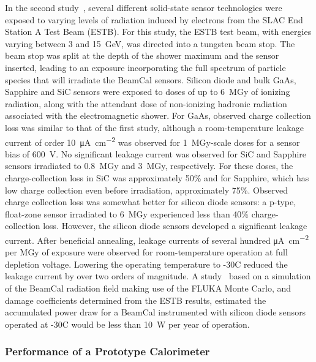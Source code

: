In the second study~\cite{Anderson:2017kkq}, several different
solid-state sensor
technologies were
exposed to varying levels of radiation induced by electrons from the
SLAC End Station A
Test Beam (ESTB).
For this study, the ESTB test beam, with energies varying between 3
and \SI{15}{GeV}, was
directed into a tungsten beam stop. The beam stop was split at the depth
of the shower maximum
and the sensor inserted,
leading to an exposure incorporating the full spectrum of particle
species that will
irradiate the BeamCal sensors. Silicon diode and bulk GaAs, Sapphire and
SiC sensors
were exposed to doses of up to \SI{6}{MGy} of ionizing radiation, along with the
attendant dose of non-ionizing hadronic radiation associated with the
electromagnetic
shower. For GaAs, observed charge collection loss was similar to that of
the first study, although a room-temperature leakage current of
order \SI{10}{\micro\ampere\per\centi\meter\squared}
was observed for \SI{1}{MGy}-scale doses for a sensor
bias of \SI{600}{V}. No significant leakage current was observed for SiC
and Sapphire sensors
irradiated to \SI{0.8}{MGy} and \SI{3}{MGy}, respectively. For these doses, the
charge-collection
loss in SiC was approximately 50\% and for Sapphire, which has low
charge collection
even before irradiation, approximately 75\%. Observed charge
collection loss was
somewhat better for silicon diode sensors: a p-type, float-zone sensor
irradiated
to \SI{6}{MGy} experienced less than 40\% charge-collection loss. However, the silicon
diode sensors developed a significant leakage current. After
beneficial annealing, leakage currents of several hundred \si{\micro\ampere\per\centi\meter\squared}
per MGy of exposure were observed for room-temperature operation at full
depletion
voltage. Lowering the operating temperature to -30\textdegree C reduced
the leakage
current by over two orders of magnitude.
A study~\cite{Schumm:2018phi}
based on a simulation of the BeamCal radiation field
making use of the FLUKA Monte Carlo\cite{Bohlen:2014buj,Ferrari:2005zk}, and damage coefficients
determined from the ESTB results, estimated the accumulated power draw
for a BeamCal instrumented with silicon diode sensors operated
at -30\textdegree C
would be less than \SI{10}{W} per year of operation.

\subsubsection{Performance of a Prototype Calorimeter}


